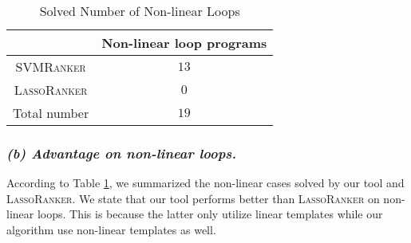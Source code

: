 \documentclass[UTF-8]{article}
\begin{document}
\begin{table}
\centering
\begin{tabular}{c|c}
& Non-linear loop programs \\
\hline
\textsc{SVMRanker} & $13$\\
\textsc{LassoRanker} & $0$\\
\hline
Total number & $19$  \\
\end{tabular}
\caption{Solved Number of Non-linear Loops}
\label{advantage_table}
\end{table}

\subsubsection{\textit{(b) Advantage on non-linear loops.}}
According to Table \ref{advantage_table}, we summarized the non-linear cases solved by our tool and \textsc{LassoRanker}. We state that our tool performs better than \textsc{LassoRanker} on non-linear loops. This is because the latter only utilize linear templates while our algorithm use non-linear templates as well.
\end{document}
